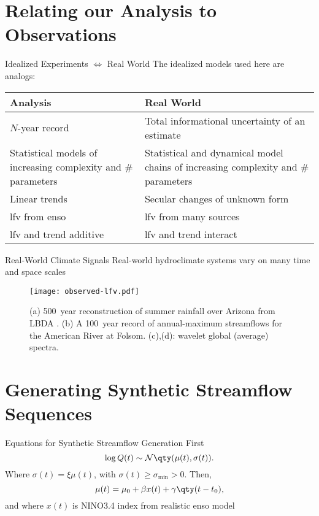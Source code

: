 \documentclass[
  10pt,     %
]{beamer}
\newcommand{\normal}{\mathcal{N}}
\begin{document}
\section{Relating our Analysis to Observations}

\begin{frame}{Idealized Experiments $\iff$ Real World}
  The idealized models used here are analogs:
  \begin{table}
    \centering
    \begin{tabular}{L{0.425\textwidth}L{0.525\textwidth}}
      \toprule
      Analysis & Real World \\\midrule
      $N$-year record & Total informational uncertainty of an estimate \\\midrule
      Statistical models of increasing complexity and \# parameters & Statistical and dynamical model chains of increasing complexity and \# parameters \\\midrule
      Linear trends & Secular changes of unknown form \\\midrule
      \gls{lfv} from \gls{enso} & \gls{lfv} from many sources \\\midrule
      \gls{lfv} and trend additive & \gls{lfv} and trend interact \\
      \bottomrule
    \end{tabular}
  \end{table}
\end{frame}

\begin{frame}{Real-World Climate Signals}
  Real-world hydroclimate systems vary on many time and space scales
  \begin{figure}
    \centering
    \texttt{[image: observed-lfv.pdf]}
    \caption{
      (a) \SI{500}{year} reconstruction of summer rainfall over Arizona from LBDA \citep{Cook:2010bz}.
      (b) A \SI{100}{year} record of annual-maximum streamflows for the American River at Folsom.
      (c),(d): wavelet global (average) spectra.
    }\label{fig:observed-lfv}
  \end{figure}
\end{frame}

\section{Generating Synthetic Streamflow Sequences}

\begin{frame}{Equations for Synthetic Streamflow Generation}
  First
  \begin{equation} \label{eq:lognormal}
    \log Q(t) \sim \normal \qty(\mu(t), \sigma(t)).
  \end{equation}
  Where $\sigma(t) = \xi \mu(t)$, with $\sigma(t) \geq \sigma_\text{min} > 0$.
  Then,
  \begin{equation}\label{eq:nino3}
    \mu(t) = \mu_0 + \beta x(t) + \gamma \qty(t - t_0),
  \end{equation}
  and where $x(t)$ is NINO3.4 index from realistic \gls{enso} model \citep{Zebiak:1987cl,Ramesh:2016hf}
\end{frame}
\end{document}
